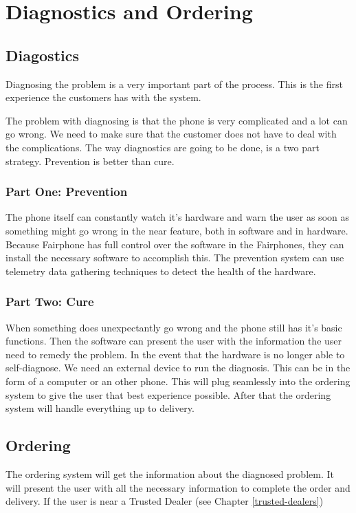 \documentclass[final]{scrreprt} %
\begin{document}
\chapter{Diagnostics and Ordering} %
\label{ch:diagnostics-ordering}

\section{Diagostics}
Diagnosing the problem is a very important part of the process.
This is the first experience the customers has with the system.

The problem with diagnosing is that the phone is very complicated and a lot can go wrong.
We need to make sure that the customer does not have to deal with the complications.
The way diagnostics are going to be done, is a two part strategy. Prevention is better than cure.

\subsection{Part One: Prevention}
The phone itself can constantly watch it's hardware and warn the user as soon as something might go wrong in the near feature, both in software and in hardware.
Because Fairphone has full control over the software in the Fairphones, they can install the necessary software to accomplish this.
The prevention system can use telemetry data gathering techniques to detect the health of the hardware.

\subsection{Part Two: Cure}
When something does unexpectantly go wrong and the phone still has it's basic functions.
Then the software can present the user with the information the user need to remedy the problem.
In the event that the hardware is no longer able to self-diagnose.
We need an external device to run the diagnosis.
This can be in the form of a computer or an other phone.
This will plug seamlessly into the ordering system to give the user that best experience possible.
After that the ordering system will handle everything up to delivery.

\section{Ordering} %
The ordering system will get the information about the diagnosed problem.
It will present the user with all the necessary information to complete the order and delivery.
If the user is near a Trusted Dealer (see Chapter \ref{trusted-dealers})
\end{document}
